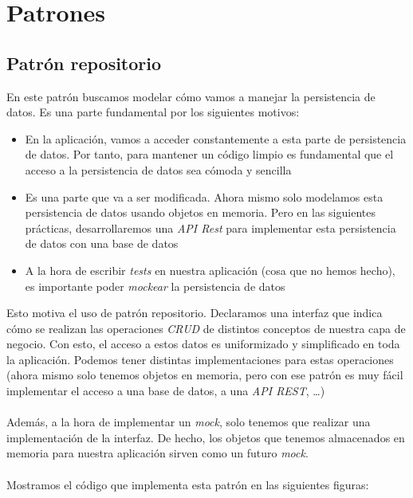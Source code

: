 \section{Patrones}

\subsection{Patrón repositorio}

En este patrón buscamos modelar cómo vamos a manejar la persistencia de datos. Es una parte fundamental por los siguientes motivos:

\begin{itemize}
    \item En la aplicación, vamos a acceder constantemente a esta parte de persistencia de datos. Por tanto, para mantener un código limpio es fundamental que el acceso a la persistencia de datos sea cómoda y sencilla
    \item Es una parte que va a ser modificada. Ahora mismo solo modelamos esta persistencia de datos usando objetos en memoria. Pero en las siguientes prácticas, desarrollaremos una \emph{API Rest} para implementar esta persistencia de datos con una base de datos
    \item A la hora de escribir \emph{tests} en nuestra aplicación (cosa que no hemos hecho), es importante poder \emph{mockear} la persistencia de datos
\end{itemize}

Esto motiva el uso de patrón repositorio. Declaramos una interfaz que indica cómo se realizan las operaciones \emph{CRUD} de distintos conceptos de nuestra capa de negocio. Con esto, el acceso a estos datos es uniformizado y simplificado en toda la aplicación. Podemos tener distintas implementaciones para estas operaciones (ahora mismo solo tenemos objetos en memoria, pero con ese patrón es muy fácil implementar el acceso a una base de datos, a una \emph{API REST}, \ldots)
\\\\
Además, a la hora de implementar un \emph{mock}, solo tenemos que realizar una implementación de la interfaz. De hecho, los objetos que tenemos almacenados en memoria para nuestra aplicación sirven como un futuro \emph{mock}.
\\\\
Mostramos el código que implementa esta patrón en las siguientes figuras:

